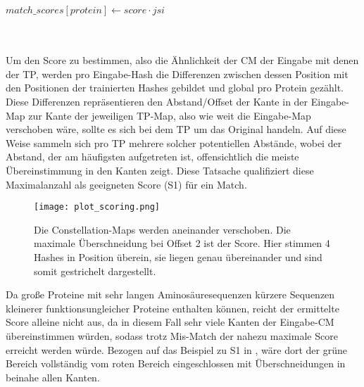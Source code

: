 \begin{enumerate}[a)]
\begin{minipage}{\Width}
\begin{algorithm}[H]
\begin{algorithmic}[1]
                                \State $match\_scores[protein] \gets score \cdot jsi$
                            \EndFor
                        \end{algorithmic}
                    \end{algorithm}
                \end{minipage}\hfill\\\hfill\\

                Um den Score zu bestimmen, also die Ähnlichkeit der \ac{CM} der Eingabe mit denen der \ac{TP}, werden pro Eingabe-Hash die Differenzen zwischen dessen Position mit den Positionen der trainierten Hashes gebildet und global pro Protein gezählt. Diese Differenzen repräsentieren den Abstand/Offset der Kante in der Eingabe-Map zur Kante der jeweiligen \ac{TP}-Map, also wie weit die Eingabe-Map verschoben wäre, sollte es sich bei dem \ac{TP} um das Original handeln. Auf diese Weise sammeln sich pro \ac{TP} mehrere solcher potentiellen Abstände, wobei der Abstand, der am häufigsten aufgetreten ist, offensichtlich die meiste Übereinstimmung in den Kanten zeigt. Diese Tatsache qualifiziert diese Maximalanzahl als geeigneten Score (S1) für ein Match.

                \begin{minipage}{\Width}
                \begin{figure}[H]
                    \centering
                    \texttt{[image: plot\_scoring.png]}
                    \caption[Ermittlung des S1-Score]{Die Constellation-Maps werden aneinander verschoben. Die maximale Überschneidung bei Offset 2 ist der Score. Hier stimmen 4 Hashes in Position überein, sie liegen genau übereinander und sind somit gestrichelt dargestellt.}
                    \label{fig:scoring}
                \end{figure}
                \end{minipage}

                Da große Proteine mit sehr langen Aminosäuresequenzen kürzere Sequenzen kleinerer funktionsungleicher Proteine enthalten können, reicht der ermittelte Score alleine nicht aus, da in diesem Fall sehr viele Kanten der Eingabe-\ac{CM} übereinstimmen würden, sodass trotz Mis-Match der nahezu maximale Score erreicht werden würde. Bezogen auf das Beispiel zu S1 in , wäre dort der grüne Bereich vollständig vom roten Bereich eingeschlossen mit Überschneidungen in beinahe allen Kanten.


\end{enumerate}
